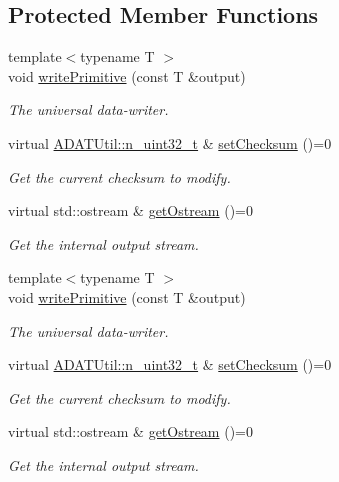 \subsection*{Protected Member Functions}
\begin{DoxyCompactItemize}
\item 
{\footnotesize template$<$typename T $>$ }\\void \mbox{\hyperlink{classADATIO_1_1BinaryWriter_a4415e2d04de75ea6310a8eed3be8f43e}{write\+Primitive}} (const T \&output)
\begin{DoxyCompactList}\small\item\em The universal data-\/writer. \end{DoxyCompactList}\item 
virtual \mbox{\hyperlink{namespaceADATUtil_ad945a8afa4db2d1f89b731964adae97e}{A\+D\+A\+T\+Util\+::n\+\_\+uint32\+\_\+t}} \& \mbox{\hyperlink{classADATIO_1_1BinaryWriter_ae64230370824192d1f0dbcaa8e74017a}{set\+Checksum}} ()=0
\begin{DoxyCompactList}\small\item\em Get the current checksum to modify. \end{DoxyCompactList}\item 
virtual std\+::ostream \& \mbox{\hyperlink{classADATIO_1_1BinaryWriter_a4fe227341d17d012bb83a070c208dac0}{get\+Ostream}} ()=0
\begin{DoxyCompactList}\small\item\em Get the internal output stream. \end{DoxyCompactList}\item 
{\footnotesize template$<$typename T $>$ }\\void \mbox{\hyperlink{classADATIO_1_1BinaryWriter_a4415e2d04de75ea6310a8eed3be8f43e}{write\+Primitive}} (const T \&output)
\begin{DoxyCompactList}\small\item\em The universal data-\/writer. \end{DoxyCompactList}\item 
virtual \mbox{\hyperlink{namespaceADATUtil_ad945a8afa4db2d1f89b731964adae97e}{A\+D\+A\+T\+Util\+::n\+\_\+uint32\+\_\+t}} \& \mbox{\hyperlink{classADATIO_1_1BinaryWriter_ae64230370824192d1f0dbcaa8e74017a}{set\+Checksum}} ()=0
\begin{DoxyCompactList}\small\item\em Get the current checksum to modify. \end{DoxyCompactList}\item 
virtual std\+::ostream \& \mbox{\hyperlink{classADATIO_1_1BinaryWriter_a4fe227341d17d012bb83a070c208dac0}{get\+Ostream}} ()=0
\begin{DoxyCompactList}\small\item\em Get the internal output stream. \end{DoxyCompactList}\end{DoxyCompactItemize}


